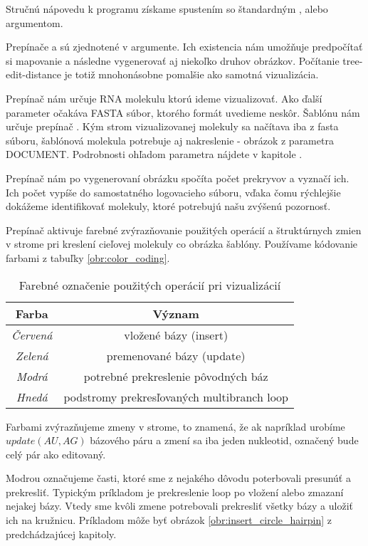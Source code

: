 Stručnú nápovedu k programu získame spustením so štandardným
, alebo  argumentom.

Prepínače  a  sú zjednotené v  argumente.
Ich existencia nám umožňuje predpočítať si mapovanie a následne vygenerovať
aj niekoľko druhov obrázkov. Počítanie tree-edit-distance je totiž mnohonásobne
pomalšie ako samotná vizualizácia.

Prepínač  nám určuje RNA molekulu ktorú ideme vizualizovať.
Ako ďalší parameter očakáva FASTA súbor, ktorého formát uvedieme neskôr.
Šablónu nám určuje prepínač .
Kým strom vizualizovanej molekuly sa načítava iba z fasta súboru,
šablónová molekula potrebuje aj nakreslenie - obrázok z parametra DOCUMENT.
Podrobnosti ohľadom parametra  nájdete v kapitole .

Prepínač  nám po vygenerovaní obrázku spočíta počet prekryvov
a vyznačí ich. Ich počet vypíše do samostatného logovacieho súboru, vďaka čomu
rýchlejšie dokážeme identifikovať molekuly, ktoré potrebujú našu zvýšenú
pozornosť.

Prepínač  aktivuje farebné zvýrazňovanie použitých operácií
a štruktúrnych zmien v strome pri kreslení cieľovej molekuly co obrázka
šablóny. Používame kódovanie farbami z tabuľky \ref{obr:color_coding}.

\begin{table}
  \centering
  \begin{tabular}{c|c}
    Farba & Význam \\
    \toprule
    \textit{Červená} & vložené bázy (insert) \\
    \midrule
    \textit{Zelená} & premenované bázy (update) \\
    \midrule
    \textit{Modrá} & potrebné prekreslenie pôvodných báz \\
    \midrule
    \textit{Hnedá} & podstromy prekresľovaných multibranch loop \\
    \bottomrule
  \end{tabular}
  \caption{Farebné označenie použitých operácií pri vizualizácií}
  \label{tab:color_coding}
\end{table}

Farbami zvýrazňujeme zmeny v strome, to znamená, že ak napríklad
urobíme $update(AU, AG)$ bázového páru a zmení sa iba jeden nukleotid,
označený bude celý pár ako editovaný.

Modrou označujeme časti, ktoré sme z nejakého dôvodu poterbovali presunúť a prekresliť.
Typickým príkladom je prekreslenie loop po vložení alebo zmazaní nejakej bázy.
Vtedy sme kvôli zmene potrebovali prekresliť všetky bázy a uložiť ich na kružnicu.
Príkladom môže byť obrázok \ref{obr:insert_circle_hairpin} z predchádzajúcej kapitoly.


